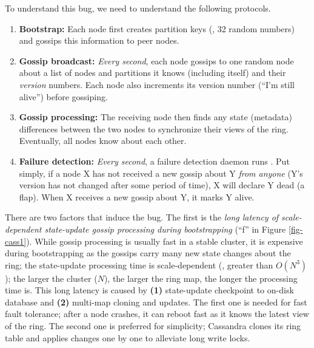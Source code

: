 %

To understand this bug, we need to understand the following protocols.

\begin{enumerate}

\item {\bf Bootstrap:} Each node first creates partition keys (\eg, 32 random
numbers) and gossips this information to peer nodes.
 
\item {\bf Gossip broadcast:} {\em Every second}, each node gossips to one
random node about a list of nodes and partitions it knows (including itself)
and their {\em version} numbers.  Each node also increments its version number
(``I'm still alive'') before gossiping.
 
\item {\bf Gossip processing:} The receiving node then finds any state
(metadata) differences between the two nodes to synchronize their views of the
ring.  Eventually, all nodes know about each other.
 
\item {\bf Failure detection:} {\em Every second}, a failure detection daemon
runs \cite{Lakshman+09-Cassandra}.  Put simply, if a node X has not received a
new gossip about Y {\em from anyone} (Y's version has not changed after some
period of time), X will declare Y dead (a flap).  When X receives a new gossip
about Y, it marks Y alive.

\end{enumerate}

There are two factors that induce the bug. The first is the {\em long latency
of scale-dependent state-update gossip processing during bootstrapping} (``f''
in Figure \ref{fig-cass1}).  While gossip processing is usually fast in a
stable cluster, it is expensive during bootstrapping as the gossips carry many
new state changes about the ring; the state-update processing time is
scale-dependent (\ie, greater than $O(N^3)$); the larger the cluster ($N$), the
larger the ring map, the longer the processing time is.
%
This long latency is caused by {\bf (1)} state-update checkpoint to on-disk
database and {\bf (2)} multi-map cloning and updates.
%
The first one is needed for fast fault tolerance; after a node crashes, it can
reboot fast as it knows the latest view of the ring.
%
The second one is preferred for simplicity; Cassandra clones its 
ring table and applies changes one by one to alleviate long write locks.
%


